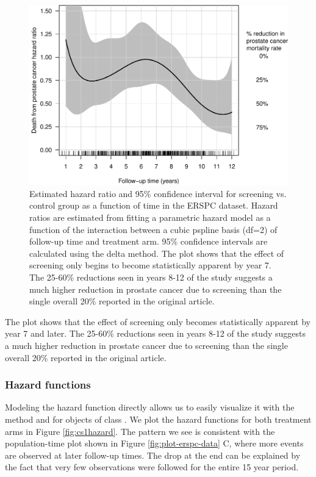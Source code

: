 \begin{Schunk}
\begin{figure}[ht]
\includegraphics[width=\textwidth,keepaspectratio=true]{./interaction-ERSPC-1} \caption[Estimated hazard ratio and 95\% confidence interval for screening vs]{Estimated hazard ratio and 95\% confidence interval for screening vs. control group as a function of time in the ERSPC dataset. Hazard ratios are estimated from fitting a parametric hazard model as a function of the interaction between a cubic pspline basis (df=2) of follow-up time and treatment arm. 95\% confidence intervals are calculated using the delta method. The plot shows that the effect of screening only begins to become statistically apparent by year 7. The 25-60\% reductions seen in years 8-12 of the study suggests a much higher reduction in prostate cancer due to screening than the single overall 20\% reported in the original article.}\label{fig:interaction-ERSPC}
\end{figure}
\end{Schunk}

The plot shows that the effect of screening only becomes statistically
apparent by year 7 and later. The 25-60\% reductions seen in years 8-12
of the study suggests a much higher reduction in prostate cancer due to
screening than the single overall 20\% reported in the original article.

\hypertarget{hazard-functions}{%
\subsubsection{Hazard functions}\label{hazard-functions}}

Modeling the hazard function directly allows us to easily visualize it
with the  method and  for objects of
class . We plot the hazard functions for both
treatment arms in Figure \ref{fig:cs1hazard}. The pattern we see is
consistent with the population-time plot shown in Figure
\ref{fig:plot-erspc-data} C, where more events are observed at later
follow-up times. The drop at the end can be explained by the fact that
very few observations were followed for the entire 15 year period.

